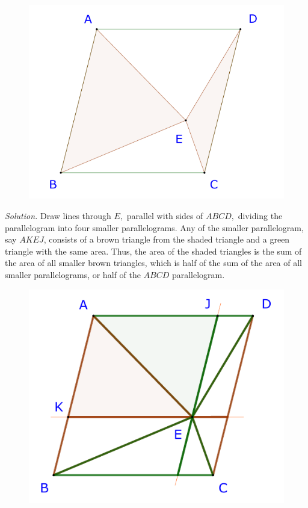 \begin{multicols}{2}
\begin{figure}[H]
		\centering
		\captionsetup{labelformat= empty, justification=centering}
		\includegraphics[width= 1\linewidth]{23-24-s3-i-p1.pdf}
		\vspace*{-20pt} 
	\end{figure}
	\textit{Solution.}
	Draw lines through $E,$ parallel with sides of $ABCD,$ dividing the parallelogram into four smaller parallelograms.
	Any of the smaller parallelogram, say $AKEJ$, consists of a brown triangle from the shaded triangle and a green triangle with the same area.
	Thus, the area of the shaded triangles is the sum of the area of all smaller brown triangles, which is half of the sum of the area of all smaller parallelograms,
	or half of the $ABCD$ parallelogram.
	\begin{figure}[H]
		\centering
		\captionsetup{labelformat= empty, justification=centering}
		\includegraphics[width= 0.95\linewidth]{23-24-s3-i-p1-s.pdf}

\end{figure}
\end{multicols}
